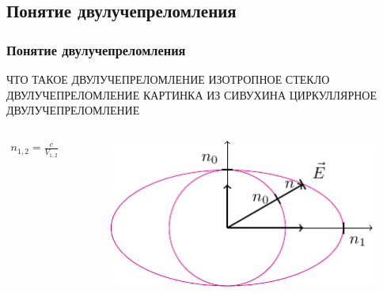 \documentclass[10pt,pdf,hyperref={unicode}, dvipsnames, handout]{beamer}
\begin{document}
\begin{frame}[t]
	\subsection{Понятие двулучепреломления}
	\frametitle{Понятие двулучепреломления}
	ЧТО ТАКОЕ ДВУЛУЧЕПРЕЛОМЛЕНИЕ
	ИЗОТРОПНОЕ СТЕКЛО ДВУЛУЧЕПРЕЛОМЛЕНИЕ%
	КАРТИНКА ИЗ СИВУХИНА
	ЦИРКУЛЛЯРНОЕ ДВУЛУЧЕПРЕЛОМЛЕНИЕ
	
	\begin{columns}
		\begin{column}{0.5\textwidth}
			
			\begin{gather*}
				n_{1,2}=\frac{c}{V_{1,2}}
			\end{gather*}
			
		\end{column}
		\begin{column}{0.5\textwidth}
			\begin{figure}[tb]
				\centering
				\includegraphics[width=\textwidth]{img/dvp2}
			\end{figure}
		\end{column}
	\end{columns}
\end{frame}
\end{document}
